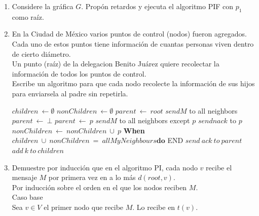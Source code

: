 \documentclass[12pt,a4paper]{report}
\begin{document}
	\begin{enumerate}
		\item {
			Considere la gráfica $G$. Propón retardos y ejecuta el algoritmo PIF con
			$p_1$ como raíz.\\
		}

		\item {
			En la Ciudad de México varios puntos de control (nodos) fueron agregados.\\
			Cada uno de estos puntos tiene información de cuantas personas viven
			dentro de cierto diámetro. \\
			Un punto (raíz) de la delegacion Benito Juárez quiere recolectar la
			información de todos los puntos de control. \\
			Escribe un algoritmo para que cada nodo recolecte la información de sus
			hijos para enviarsela al padre sin repetirla.\\

			\begin{algorithmic}[1]
				\State $children \ \leftarrow \emptyset$
				\State $nonChildren \ \leftarrow \emptyset$
					\State $parent\ \leftarrow\ root$
					\State $send M$ to all neighbors
				\Else
					\State $parent\ \leftarrow\ \bot$
				\EndIf
				\State {}
				\Start
						\State $parent\ \leftarrow\ p$
						\State $send M$ to all neighbors except $p$
					\Else
						\State $send nack$ to $p$
					\EndIf
				\End
				\State {}
				\Start
					\State $nonChildren\ \leftarrow\ nonChildren\ \cup\ {p}$
				\End
				\textbf{When} $children\ \cup\ nonChildren\ =\ allMyNeighbours
							\textbf{do}$
				\Start
						\State END
					\Else
						\State $send\ ack\ to\ parent$
					\EndIf
				\Start
					\State $add\ k\ to\ children$
				\End
				\End
			\end{algorithmic}
			}

		\item{
			Demuestre por inducción que en el algoritmo PI, cada nodo $v$ recibe el
			mensaje $M$ por primera vez en a lo más $d(root, v)$.\\

			Por inducción sobre el orden en el que los nodos reciben $M$.\\
			Caso base\\
			Sea $v \in V$ el primer nodo que recibe $M$. Lo recibe en $t(v)$.

}
\end{enumerate}
\end{document}
